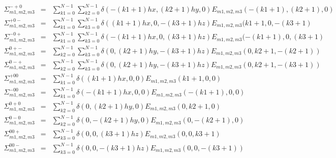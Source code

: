 \begin{align*}
\Sigma_{m1,m2,m3}^{-+0}&=&\sum_{k1=0}^{N-1}\sum_{k2=0}^{N-1}\delta(-(k1+1)hx,(k2+1)hy, 0) E_{m1,m2,m3}(-(k1+1),(k2+1),0)\\
\Sigma_{m1,m2,m3}^{+0-}&=&\sum_{k1=0}^{N-1}\sum_{k3=0}^{N-1}\delta((k1+1)hx,0,-(k3+1)hz) E_{m1,m2,m3}(k1+1,0,-(k3+1)\\
\Sigma_{m1,m2,m3}^{-0+}&=&\sum_{k1=0}^{N-1}\sum_{k3=0}^{N-1}\delta(-(k1+1)hx,0,(k3+1)hz) E_{m1,m2,m3}(-(k1+1),0,(k3+1)\\
\Sigma_{m1,m2,m3}^{0+-}&=&\sum_{k2=0}^{N-1}\sum_{k3=0}^{N-1}\delta(0, (k2+1)hy,-(k3+1)hz) E_{m1,m2,m3}(0, k2+1,-(k2+1))\\
\Sigma_{m1,m2,m3}^{0-+}&=&\sum_{k2=0}^{N-1}\sum_{k3=0}^{N-1}\delta(0, (k2+1)hy,-(k3+1)hz) E_{m1,m2,m3}(0, k2+1,-(k3+1))\\
\Sigma_{m1,m2,m3}^{+00}&=&\sum_{k1=0}^{N-1}\delta((k1+1)hx,0,0) E_{m1,m2,m3}(k1+1,0,0)\\
\Sigma_{m1,m2,m3}^{-00}&=&\sum_{k1=0}^{N-1}\delta(-(k1+1)hx,0,0) E_{m1,m2,m3}(-(k1+1),0,0)\\
\Sigma_{m1,m2,m3}^{0+0}&=&\sum_{k2=0}^{N-1}\delta(0,(k2+1)hy,0) E_{m1,m2,m3}(0,k2+1,0)\\
\Sigma_{m1,m2,m3}^{0-0}&=&\sum_{k2=0}^{N-1}\delta(0,-(k2+1)hy,0) E_{m1,m2,m3}(0,-(k2+1),0)\\
\Sigma_{m1,m2,m3}^{00+}&=&\sum_{k3=0}^{N-1}\delta(0,0,(k3+1)hz) E_{m1,m2,m3}(0,0,k3+1)\\
\Sigma_{m1,m2,m3}^{00-}&=&\sum_{k3=0}^{N-1}\delta(0,0,-(k3+1)hz) E_{m1,m2,m3}(0,0,-(k3+1))\\
\end{align*}


